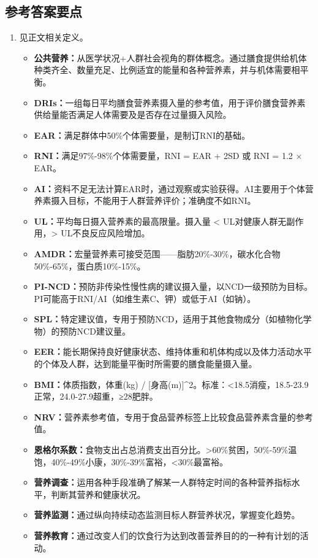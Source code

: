{\subsection*{参考答案要点}

\begin{enumerate}[leftmargin=*, itemsep=5pt]
    \item 见正文相关定义。
    \begin{itemize}
        \item \textbf{公共营养：}从医学状况+人群社会视角的群体概念。通过膳食提供给机体种类齐全、数量充足、比例适宜的能量和各种营养素，并与机体需要相平衡。
        \item \textbf{DRIs：}一组每日平均膳食营养素摄入量的参考值，用于评价膳食营养素供给量能否满足人体需要及是否存在过量摄入风险。
        \item \textbf{EAR：}满足群体中50\%个体需要量，是制订RNI的基础。
        \item \textbf{RNI：}满足97\%-98\%个体需要量，RNI = EAR + 2SD 或 RNI = 1.2 × EAR。
        \item \textbf{AI：}资料不足无法计算EAR时，通过观察或实验获得。AI主要用于个体营养素摄入目标，不能用于人群营养评价；准确度不如RNI。
        \item \textbf{UL：}平均每日摄入营养素的最高限量。摄入量 < UL对健康人群无副作用，> UL不良反应风险增加。
        \item \textbf{AMDR：}宏量营养素可接受范围——脂肪20\%-30\%，碳水化合物50\%-65\%，蛋白质10\%-15\%。
        \item \textbf{PI-NCD：}预防非传染性慢性病的建议摄入量，以NCD一级预防为目标。PI可能高于RNI/AI（如维生素C、钾）或低于AI（如钠）。
        \item \textbf{SPL：}特定建议值，专用于预防NCD，适用于其他食物成分（如植物化学物）的预防NCD建议量。
        \item \textbf{EER：}能长期保持良好健康状态、维持体重和机体构成以及体力活动水平的个体及人群，达到能量平衡时所需要的膳食能量摄入量。
        \item \textbf{BMI：}体质指数，体重(kg) / [身高(m)]^{2}。标准：<18.5消瘦，18.5-23.9正常，24.0-27.9超重，≥28肥胖。
        \item \textbf{NRV：}营养素参考值，专用于食品营养标签上比较食品营养素含量的参考值。
        \item \textbf{恩格尔系数：}食物支出占总消费支出百分比。>60\%贫困，50\%-59\%温饱，40\%-49\%小康，30\%-39\%富裕，<30\%最富裕。
        \item \textbf{营养调查：}运用各种手段准确了解某一人群特定时间的各种营养指标水平，判断其营养和健康状况。
        \item \textbf{营养监测：}通过纵向持续动态监测目标人群营养状况，掌握变化趋势。
        \item \textbf{营养教育：}通过改变人们的饮食行为达到改善营养目的的一种有计划的活动。
    \end{itemize}


\end{enumerate}}
